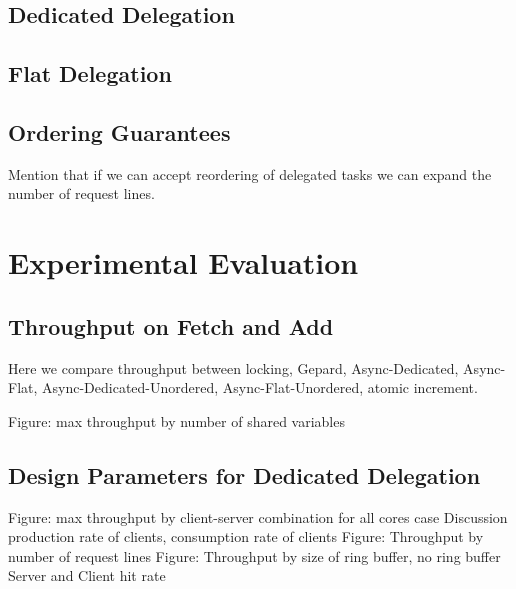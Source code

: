 \documentclass{uicthesi}
\begin{document}
\section{Dedicated Delegation}
\section{Flat Delegation}
\section{Ordering Guarantees}
Mention that if we can accept reordering of delegated tasks we can expand the number of request lines. 


\chapter{Experimental Evaluation}
\section{Throughput on Fetch and Add}
Here we compare throughput between locking, Gepard, Async-Dedicated, Async-Flat, Async-Dedicated-Unordered, Async-Flat-Unordered, atomic increment. 

Figure: max throughput by number of shared variables


\section{Design Parameters for Dedicated Delegation}

Figure: max throughput by client-server combination for all cores case
	Discussion production rate of clients, consumption rate of clients
Figure: Throughput by number of request lines
Figure: Throughput by size of ring buffer, no ring buffer
	Server and Client hit rate
\end{document}
